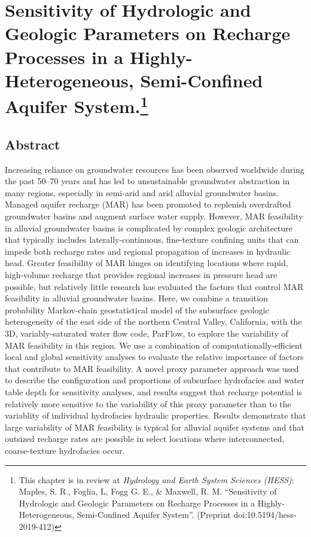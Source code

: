 
\chapter[Sensitivity of Hydrologic and Geologic Parameters on Recharge Processes in a Highly-Heterogeneous, Semi-Confined Aquifer System]{Sensitivity of Hydrologic and Geologic Parameters on Recharge Processes in a Highly-Heterogeneous, Semi-Confined Aquifer System.\footnote[1]{This chapter is in review at \textit{Hydrology and Earth System Sciences (HESS)}: Maples, S. R., Foglia, L, Fogg G. E., \& Maxwell, R. M. ``Sensitivity of Hydrologic and Geologic Parameters on Recharge Processes in a Highly-Heterogeneous, Semi-Confined Aquifer System''. (Preprint doi:10.5194/hess-2019-412)}}

\section{Abstract}

\noindent Increasing reliance on groundwater resources has been observed worldwide during the past 50–70 years and has led to unsustainable groundwater abstraction in many regions, especially in semi-arid and arid alluvial groundwater basins. Managed aquifer recharge (MAR) has been promoted to replenish overdrafted groundwater basins and augment surface water supply. However, MAR feasibility in alluvial groundwater basins is complicated by complex geologic architecture that typically includes laterally-continuous, fine-texture confining units that can impede both recharge rates and regional propagation of increases in hydraulic head. Greater feasibility of MAR hinges on identifying locations where rapid, high-volume recharge that provides regional increases in pressure head are possible, but relatively little research has evaluated the factors that control MAR feasibility in alluvial groundwater basins. Here, we combine a transition probability Markov-chain geostatistical model of the subsurface geologic heterogeneity of the east side of the northern Central Valley, California, with the 3D, variably-saturated water flow code, ParFlow, to explore the variability of MAR feasibility in this region. We use a combination of computationally-efficient local and global sensitivity analyses to evaluate the relative importance of factors that contribute to MAR feasibility. A novel proxy parameter approach was used to describe the configuration and proportions of subsurface hydrofacies and water table depth for sensitivity analyses, and results suggest that recharge potential is relatively more sensitive to the variability of this proxy parameter than to the variablity of individual hydrofacies hydraulic properties. Results demonstrate that large variability of MAR feasibility is typical for alluvial aquifer systems and that outsized recharge rates are possible in select locations where interconnected, coarse-texture hydrofacies occur.

